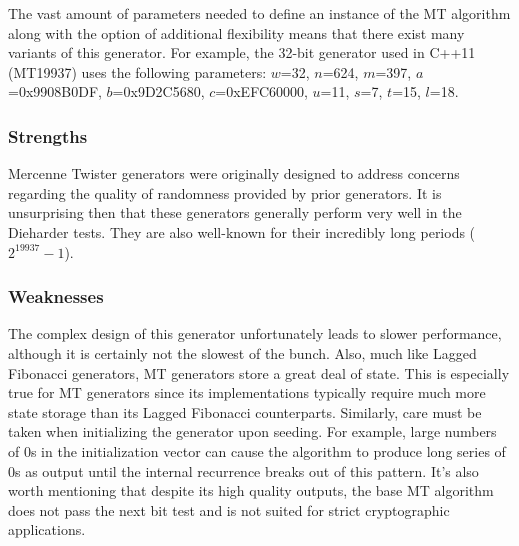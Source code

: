 The vast amount of parameters needed to define an instance of the MT algorithm along with the option of additional flexibility means that there exist many variants of this generator. For example, the 32-bit generator used in C++11 (MT19937) uses the following parameters: $w$=32, $n$=624, $m$=397, $a$=0x9908B0DF, $b$=0x9D2C5680, $c$=0xEFC60000, $u$=11, $s$=7, $t$=15, $l$=18.

\subsubsection{Strengths}
Mercenne Twister generators were originally designed to address concerns regarding the quality of randomness provided by prior generators. It is unsurprising then that these generators generally perform very well in the Dieharder tests. They are also well-known for their incredibly long periods ($2^{19937}-1$).

\subsubsection{Weaknesses}
The complex design of this generator unfortunately leads to slower performance, although it is certainly not the slowest of the bunch. Also, much like Lagged Fibonacci generators, MT generators store a great deal of state. This is especially true for MT generators since its implementations typically require much more state storage than its Lagged Fibonacci counterparts. Similarly, care must be taken when initializing the generator upon seeding. For example, large numbers of 0s in the initialization vector can cause the algorithm to produce long series of 0s as output until the internal recurrence breaks out of this pattern. It's also worth mentioning that despite its high quality outputs, the base MT algorithm does not pass the next bit test and is not suited for strict cryptographic applications.
